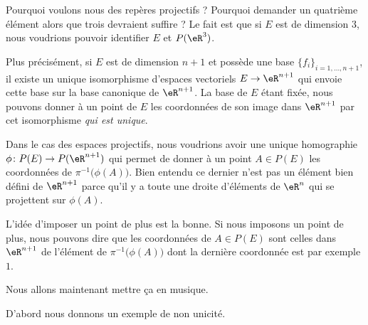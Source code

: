 \begin{normaltext}
	Pourquoi voulons nous des repères projectifs ? Pourquoi demander un quatrième élément alors que trois devraient suffire ? Le fait est que si \( E\) est de dimension \( 3\), nous voudrions pouvoir identifier \( E\) et \( P(\eR^3)\).

	Plus précisément, si \( E\) est de dimension \( n+1\) et possède une base \( \{ f_i \}_{i=1,\ldots, n+1}\), il existe un unique isomorphisme d'espaces vectoriels \( E\to \eR^{n+1}\) qui envoie cette base sur la base canonique de \( \eR^{n+1}\). La base de \( E\) étant fixée, nous pouvons donner à un point de \( E\) les coordonnées de son image dans \( \eR^{n+1}\) par cet isomorphisme \emph{qui est unique}.

	Dans le cas des espaces projectifs, nous voudrions avoir une unique homographie \( \phi\colon P(E)\to P(\eR^{n+1})\) qui permet de donner à un point \( A\in P(E)\) les coordonnées de \( \pi^{-1}\big( \phi(A) \big)\). Bien entendu ce dernier n'est pas un élément bien défini de \( \eR^{n+1}\) parce qu'il y a toute une droite d'éléments de \( \eR^n\) qui se projettent sur \( \phi(A)\).

	L'idée d'imposer un point de plus est la bonne. Si nous imposons un point de plus, nous pouvons dire que les coordonnées de \( A\in P(E)\) sont celles dans \( \eR^{n+1}\) de l'élément de \( \pi^{-1}\big( \phi(A) \big)\) dont la dernière coordonnée est par exemple \( 1\).

	Nous allons maintenant mettre ça en musique.
\end{normaltext}

D'abord nous donnons un exemple de non unicité.

